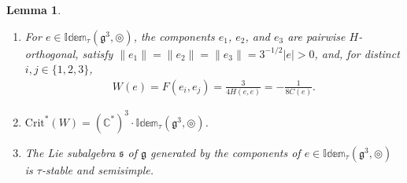 \documentclass[leqno,10pt]{amsart}
\newtheorem{lemma}[theorem]{Lemma}%
\theoremstyle{definition}
\numberwithin{equation}{section}
\newcommand{\idem}{\mathbb{Idem}}
\newcommand{\tmlt}{\circledcirc}
\newcommand{\g}{\mathfrak{g}}
\newcommand{\com}{\mathbb C}
\newcommand{\crtnt}{\mathrm{Crit}^*}
\newcommand{\norm}[1]{\lVert #1\rVert}
\newcommand{\nnorm}[1]{\lvert #1\rvert}%
\newcommand{\subs}{\mathfrak{s}}
\begin{document}
\begin{lemma}\label{thm:idem}
\leavevmode\noindent
\begin{enumerate}[label=(\arabic*), ref=(\arabic*)]
\item\label{idem2} For $e\in \idem_{\tau}(\g^{3}, \tmlt)$, the components $e_{1}$, $e_{2}$, and $e_{3}$ are pairwise $H$-orthogonal, satisfy $\norm{e_{1}} = \norm{e_{2}} = \norm{e_{3}} = 3^{-1/2}\nnorm{e} > 0$, and, for distinct $i, j \in \{1, 2, 3\}$,
\begin{align}\label{eq:idemnorms}
 W(e) = F(e_{i}, e_{j}) =  \frac{3}{4H(e, e)} = -\frac{1}{8C(e)}.
\end{align}
\item\label{idem1} $\crtnt(W) = (\com^{\ast})^{3}\cdot \idem_{\tau}(\g^{3}, \tmlt)$.
\item\label{idem3} The Lie subalgebra $\subs$ of $\g$ generated by the components of $e \in \idem_{\tau}(\g^{3}, \tmlt)$ is $\tau$-stable and semisimple. 
\end{enumerate}
\end{lemma}
\end{document}
